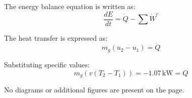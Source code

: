 The energy balance equation is written as:  
\[
\frac{dE}{dt} = \dot{Q} - \sum \dot{W}^c
\]  

The heat transfer is expressed as:  
\[
m_g (u_2 - u_1) = \dot{Q}
\]  

Substituting specific values:  
\[
m_g (v(T_2 - T_1)) = -1.07 \, \text{kW} = Q
\]  

No diagrams or additional figures are present on the page.